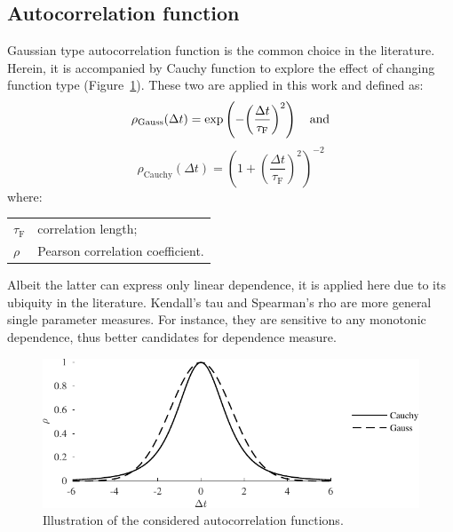 \subsection{Autocorrelation function}

Gaussian type autocorrelation function is the common choice in the literature. Herein, it is accompanied by Cauchy function to explore the effect of changing function type (Figure~\ref{fig:acorr_fun}). These two are applied in this work and defined as:
\begin{equation}
\label{eq:autocorr_gauss}
	{\rho _{{\mathrm{Gauss}}}}(\Delta t) = \exp \left( { - {{\left( {\frac{{\Delta t}}{{{\tau _\mathrm{F}}}}} \right)}^2}} \right) \text{\quad and}
\end{equation}
\begin{equation}
\label{eq:autocorr_cauchy}
	{\rho _{{\mathrm{Cauchy}}}}(\Delta t) = {\left( {1 + {{\left( {\frac{{\Delta t}}{{{\tau _\mathrm{F}}}}} \right)}^2}} \right)^{ - 2}}
\end{equation}
where:

\begin{tabular}{ll}
	$\tau_\mathrm{F}$ & correlation length; \\
	$\rho$ & Pearson correlation coefficient.
\end{tabular} \medskip

\noindent
Albeit the latter can express only linear dependence, it is applied here due to its ubiquity in the literature. Kendall's tau and Spearman's rho are more general single parameter measures. For instance, they are sensitive to any monotonic dependence, thus better candidates for dependence measure.

\begin{figure}[htbp!] 
	\centering    
	\includegraphics[]{autocorr_fun_illustration.pdf}
	\caption{Illustration of the considered autocorrelation functions.}
	\label{fig:acorr_fun}
\end{figure}

